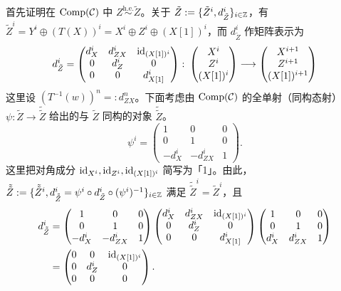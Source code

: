 首先证明在 $\operatorname{Comp}(\mathcal{C})$ 中 $Z\overset{\mathrm{h.e.}}{\sim}\tilde Z$。关于 $\tilde Z := \{\tilde Z^i, d^i_{\tilde Z}\}_{i\in\mathbb{Z}}$，有 $\tilde Z^i = Y^i\oplus(T(X))^i = X^i\oplus Z^i\oplus(X[1])^i$，而 $d^i_{\tilde Z}$ 作矩阵表示为
\begin{equation}
d^i_{\tilde Z} = \begin{pmatrix} d^i_X & d^i_{ZX} & \mathrm{id}_{(X[1])^i} \\ 0 & d^i_Z & 0 \\ 0 & 0 & d^i_{X[1]}\end{pmatrix}\colon
\begin{pmatrix} X^i \\ Z^i \\ (X[1])^i\end{pmatrix}\longrightarrow
\begin{pmatrix} X^{i+1} \\ Z^{i+1} \\ (X[1])^{i+1}\end{pmatrix}
\end{equation}
这里设 $(T^{-1}(w))^n =: d^n_{ZX}$。下面考虑由 $\operatorname{Comp}(\mathcal{C})$ 的全单射（同构态射）$\psi\colon\tilde Z\to\tilde{\tilde Z}$ 给出的与 $\tilde Z$ 同构的对象 $\tilde{\tilde Z}$。
\[
\psi^i = \begin{pmatrix} 1 & 0 & 0 \\ 0 & 1 & 0 \\ -d^i_X & -d^i_{ZX} & 1\end{pmatrix}.
\]
这里把对角成分 $\mathrm{id}_{X^i},\mathrm{id}_{Z^i},\mathrm{id}_{(X[1])^i}$ 简写为「1」。由此，$\tilde{\tilde Z} := \{\tilde{\tilde Z}^i, d^i_{\tilde{\tilde Z}} = \psi^i\circ d^i_{\tilde Z}\circ(\psi^i)^{-1}\}_{i\in\mathbb{Z}}$ 满足 $\tilde{\tilde Z}^i = \tilde Z^i$，且
\[
\begin{aligned}
d^i_{\tilde{\tilde Z}}
&= \begin{pmatrix} 1 & 0 & 0 \\ 0 & 1 & 0 \\ -d^i_X & -d^i_{ZX} & 1\end{pmatrix}
\begin{pmatrix} d^i_X & d^i_{ZX} & \mathrm{id}_{(X[1])^i} \\ 0 & d^i_Z & 0 \\ 0 & 0 & d^i_{X[1]}\end{pmatrix}
\begin{pmatrix} 1 & 0 & 0 \\ 0 & 1 & 0 \\ d^i_X & d^i_{ZX} & 1\end{pmatrix}\\
&= \begin{pmatrix} 0 & 0 & \mathrm{id}_{(X[1])^i} \\ 0 & d^i_Z & 0 \\ 0 & 0 & 0\end{pmatrix}.
\end{aligned}
\]
